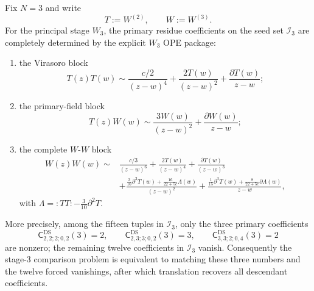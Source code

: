 \begin{proposition}
\label{prop:winfty-ds-stage3-explicit-packet}
Fix $N=3$ and write
\[
T:=W^{(2)},
\qquad
W:=W^{(3)}.
\]
For the principal stage $W_3$, the primary residue coefficients on the
seed set $\mathcal{I}_3$ are completely determined by the explicit
$W_3$ OPE package:
\begin{enumerate}
\item the Virasoro block
  \[
  T(z)T(w)\sim \frac{c/2}{(z-w)^4}
  +\frac{2T(w)}{(z-w)^2}
  +\frac{\partial T(w)}{z-w};
  \]
\item the primary-field block
  \[
  T(z)W(w)\sim \frac{3W(w)}{(z-w)^2}
  +\frac{\partial W(w)}{z-w};
  \]
\item the complete $W$-$W$ block
  \begin{align*}
  W(z)W(w)\sim {} &
  \frac{c/3}{(z-w)^6}
  +\frac{2T(w)}{(z-w)^4}
  +\frac{\partial T(w)}{(z-w)^3} \\
  & +
  \frac{\frac{3}{10}\partial^2T(w)
  +\frac{16}{22+5c}\Lambda(w)}{(z-w)^2}
  +\frac{\frac{1}{15}\partial^3T(w)
  +\frac{8}{22+5c}\partial\Lambda(w)}{z-w},
  \end{align*}
  with $\Lambda={:}TT{:}-\frac{3}{10}\partial^2T$.
\end{enumerate}
More precisely, among the fifteen tuples in $\mathcal{I}_3$, only the
three primary coefficients
\[
\mathsf{C}^{\mathrm{DS}}_{2,2;2;0,2}(3)=2,
\qquad
\mathsf{C}^{\mathrm{DS}}_{2,3;3;0,2}(3)=3,
\qquad
\mathsf{C}^{\mathrm{DS}}_{3,3;2;0,4}(3)=2
\]
are nonzero; the remaining twelve coefficients in $\mathcal{I}_3$
vanish.  Consequently the stage-$3$ comparison problem is equivalent to
matching these three numbers and the twelve forced vanishings, after
which translation recovers all descendant coefficients.
\end{proposition}


